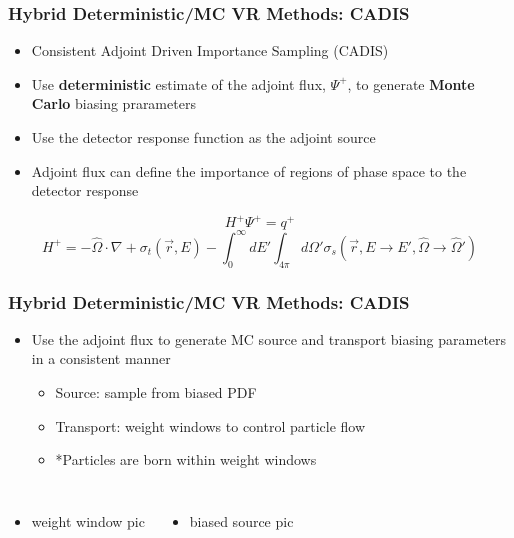 \documentclass{beamer}
\begin{document}
\begin{frame}
\frametitle{Hybrid Deterministic/MC VR Methods: CADIS}
\begin{itemize}
\item{Consistent Adjoint Driven Importance Sampling (CADIS)}
\item{Use \textbf{deterministic} estimate of the adjoint flux, $\Psi^+$, to generate \textbf{Monte Carlo} biasing prarameters}
\item{Use the detector response function as the adjoint source}
\end{itemize}
\begin{itemize}
\item{Adjoint flux can define the importance of regions of phase space to the detector response}
\end{itemize}

\vspace{0.2cm}
       \begin{equation}
        H^+\Psi^+ = q^+
       \end{equation} 
       \begin{equation}
	H^{+} = -\widehat{\Omega} \cdot \nabla +
	    \sigma_{t}(\overrightarrow{r},E) - 
		\int_{0}^{\infty} dE'
		\int_{4\pi} d\Omega'
		\sigma_{s}( \overrightarrow{r}, E 
		\rightarrow E', \widehat{\Omega} 
		\rightarrow \widehat{\Omega}' )
       \end{equation}
\end{frame}

\begin{frame}
\frametitle{Hybrid Deterministic/MC VR Methods: CADIS}
  \begin{itemize}
  \item{Use the adjoint flux to generate MC source and transport biasing parameters in a consistent manner}
    \begin{itemize}
    \item{Source: sample from biased PDF}
    \item{Transport: weight windows to control particle flow}
    \item{*Particles are born within weight windows}
    \end{itemize}
  \end{itemize}
	\begin{columns}
		\begin{itemize}
			\item{weight window pic}
		\end{itemize}
		\begin{itemize}
			\item{biased source pic}
		\end{itemize}
	\end{columns}
\end{frame}
\end{document}
